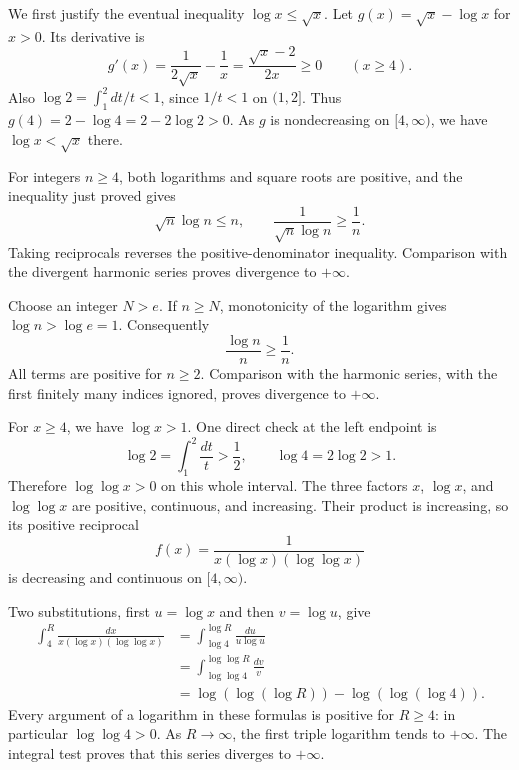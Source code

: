 We first justify the eventual inequality $\log x\le\sqrt x$.
Let $g(x)=\sqrt x-\log x$ for $x>0$. Its derivative is
\[
 g'(x)=\frac{1}{2\sqrt x}-\frac1x
       =\frac{\sqrt x-2}{2x}\ge0\qquad(x\ge4).
\]
Also $\log2=\int_1^2dt/t<1$, since $1/t<1$ on $(1,2]$.
Thus $g(4)=2-\log4=2-2\log2>0$. As $g$ is nondecreasing
on $[4,\infty)$, we have $\log x<\sqrt x$ there.

For integers $n\ge4$, both logarithms and square roots are positive,
and the inequality just proved gives
\[
 \sqrt n\log n\le n,
 \qquad
 \frac{1}{\sqrt n\log n}\ge\frac1n.
\]
Taking reciprocals reverses the positive-denominator inequality.
Comparison with the divergent harmonic series proves divergence
to $+\infty$.

Choose an integer $N>e$. If $n\ge N$, monotonicity of the
logarithm gives $\log n>\log e=1$. Consequently
\[
 \frac{\log n}{n}\ge\frac1n.
\]
All terms are positive for $n\ge2$. Comparison with the harmonic
series, with the first finitely many indices ignored, proves
divergence to $+\infty$.

For $x\ge4$, we have $\log x>1$. One direct check at the left
endpoint is
\[
 \log2=\int_1^2\frac{dt}{t}>\frac12,
 \qquad \log4=2\log2>1.
\]
Therefore $\log\log x>0$ on this whole interval.
The three factors $x$, $\log x$, and $\log\log x$ are positive,
continuous, and increasing. Their product is increasing, so its
positive reciprocal
\[
 f(x)=\frac{1}{x(\log x)(\log\log x)}
\]
is decreasing and continuous on $[4,\infty)$.

Two substitutions, first $u=\log x$ and then $v=\log u$, give
\[
 \begin{aligned}
 \int_4^R\frac{dx}{x(\log x)(\log\log x)}
 &=\int_{\log4}^{\log R}\frac{du}{u\log u}\\
 &=\int_{\log\log4}^{\log\log R}\frac{dv}{v}\\
 &=\log(\log(\log R))-\log(\log(\log4)).
 \end{aligned}
\]
Every argument of a logarithm in these formulas is positive for
$R\ge4$: in particular $\log\log4>0$. As $R\to\infty$, the
first triple logarithm tends to $+\infty$. The integral test proves
that this series diverges to $+\infty$.

